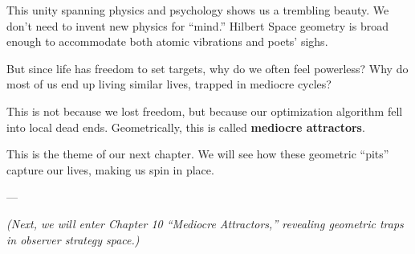 This unity spanning physics and psychology shows us a trembling beauty. We don't need to invent new physics for ``mind.'' Hilbert Space geometry is broad enough to accommodate both atomic vibrations and poets' sighs.

But since life has freedom to set targets, why do we often feel powerless? Why do most of us end up living similar lives, trapped in mediocre cycles?

This is not because we lost freedom, but because our optimization algorithm fell into local dead ends. Geometrically, this is called \textbf{mediocre attractors}.

This is the theme of our next chapter. We will see how these geometric ``pits'' capture our lives, making us spin in place.

---

\textit{(Next, we will enter Chapter 10 ``Mediocre Attractors,'' revealing geometric traps in observer strategy space.)}

